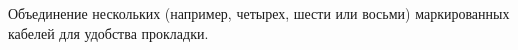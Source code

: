 Объединение нескольких (например, четырех, шести или восьми)
маркированных кабелей для удобства прокладки.